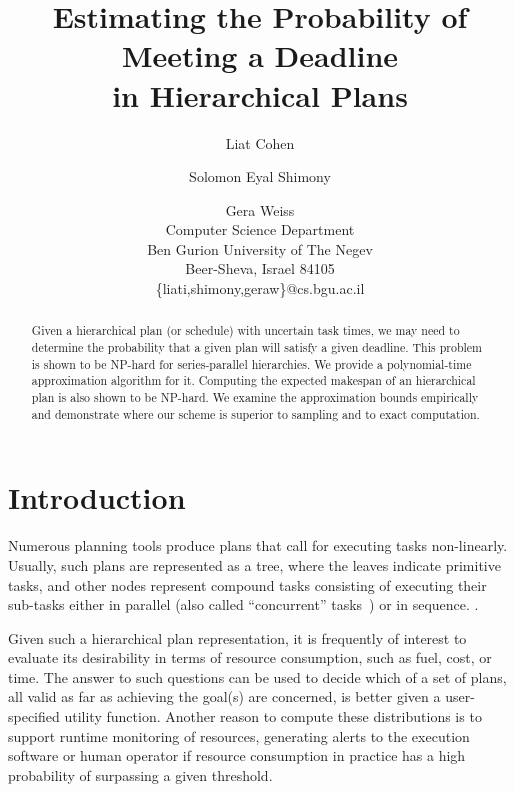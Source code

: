 \documentclass{article}
\begin{document}
\title{Estimating the Probability of Meeting a Deadline \\ in Hierarchical Plans}


\author{Liat Cohen \and Solomon Eyal Shimony \and Gera Weiss\\
Computer Science Department\\
Ben Gurion University of The Negev\\
Beer-Sheva, Israel 84105\\
\{liati,shimony,geraw\}@cs.bgu.ac.il
}



\maketitle

\begin{abstract}
Given a hierarchical plan (or schedule) with uncertain task times, we may need to determine
the probability that a given plan will satisfy a given deadline.
This problem is shown to be NP-hard for series-parallel hierarchies. We provide a polynomial-time approximation algorithm for it. 
Computing the expected makespan of an hierarchical plan is also shown to be NP-hard.
We examine the approximation bounds empirically and demonstrate 
where our scheme is superior to sampling and to exact computation.%

\end{abstract}  

\section{Introduction}

Numerous planning tools produce plans that call for executing tasks non-linearly.
Usually, such plans are represented as a tree, where the
leaves indicate primitive tasks, and other nodes represent compound tasks consisting of executing
their sub-tasks either in parallel (also called ``concurrent'' tasks~\cite{gabaldon2002programming}) or in sequence.
\cite{erol1994htn,nau1998control,nau2003shop2,kelly2008offline}.

Given such a hierarchical plan representation, it is frequently of interest to evaluate its desirability in terms of
resource consumption, such as fuel, cost, or time. The answer to such questions can be used to
decide which of a set of plans, all valid as far as achieving the goal(s) are
concerned, is better given a user-specified utility function. Another reason to compute these
distributions is to support runtime monitoring of resources, generating alerts to the execution
software or human operator if resource consumption in practice
has a high probability of surpassing a given threshold.
\end{document}
